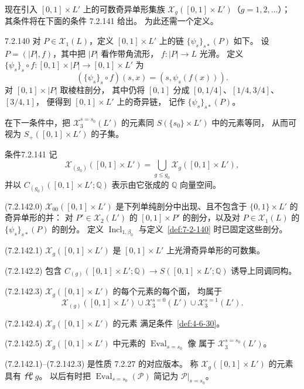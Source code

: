 现在引入 $[0,1]\times L'$ 上的可数奇异单形集族
$\mathcal X_g([0,1]\times L')$（$g=1,2,\ldots$）；
其条件将在下面的条件 7.2.141 给出。
为此还需一个定义。

\begin{definition}{7.2.140}\label{def:7-2-140}
对 $P\in\mathcal X_1(L)$，定义
$[0,1]\times L'$ 上的链 $\{\psi_s\}_{s*}(P)$ 如下。
设 $P=(|P|,f)$，其中把 $|P|$ 看作带角流形，
$f\colon|P|\to L$ 光滑。
定义
$\{\psi_s\}_s\circ f\colon
[0,1]\times|P|\to[0,1]\times L'$ 为
\[
(\{\psi_s\}_s\circ f)(s,x)
=(s,\psi_s(f(x))).
\]
对 $[0,1]\times|P|$ 取棱柱剖分，
其中仍将 $[0,1]$ 分成
$[0,1/4]$、$[1/4,3/4]$、$[3/4,1]$，
便得到 $[0,1]\times L'$ 上的奇异链，
记作 $\{\psi_s\}_{s*}(P)$。
\end{definition}

在下一条件中，把 $\mathcal X^{s=s_0}_3(L')$
的元素同 $S(\{s_0\}\times L')$ 中的元素等同，
从而可视为 $S_+([0,1]\times L')$ 的子集。

\begin{statement}{条件}{7.2.141}\label{cond:7-2-141}
记
\[
\mathcal X_{(g_0)}([0,1]\times L')
=\bigcup_{g\le g_0}\mathcal X_g([0,1]\times L'),
\]
并以 $C_{(g_0)}([0,1]\times L';\mathbb Q)$
表示由它张成的 $\mathbb Q$ 向量空间。

\noindent\textup{(7.2.142.0)}\quad
$\mathcal X_{00}([0,1]\times L')$
是下列单纯剖分中出现、且不包含于
$\{0,1\}\times L'$ 的奇异单形的并：
对 $P'\in\mathcal X_2(L')$ 的
$[0,1]\times P'$ 的剖分，以及对
$P\in\mathcal X_1(L)$ 的
$\{\psi_s\}_{s*}(P)$ 的剖分。
定义 $\operatorname{Incl}_{1,\beta_0}$
与定义~\ref{def:7-2-140} 时已固定这些剖分。

\noindent\textup{(7.2.142.1)}\quad
$\mathcal X_g([0,1]\times L')$
是 $[0,1]\times L'$ 上光滑奇异单形的可数集。

\noindent\textup{(7.2.142.2)}\quad
包含
$C_{(g)}([0,1]\times L';\mathbb Q)
\to S([0,1]\times L';\mathbb Q)$
诱导上同调同构。

\noindent\textup{(7.2.142.3)}\quad
$\mathcal X_g([0,1]\times L')$ 的每个元素的每个面，
均属于
\[
\mathcal X_{(g)}([0,1]\times L')
\cup\mathcal X_3^{s=0}(L')
\cup\mathcal X_3^{s=1}(L').
\]

\noindent\textup{(7.2.142.4)}\quad
$\mathcal X_g([0,1]\times L')$ 的元素
满足条件~\ref{def:4-6-30}。

\noindent\textup{(7.2.142.5)}\quad
$\mathcal X_g([0,1]\times L')$ 中元素的
$\operatorname{Eval}_{s=s_0}$ 像
属于 $\mathcal X^{s=s_0}_3(L')$。
\end{statement}

(7.2.142.1)--(7.2.142.3) 是性质 7.2.27 的对应版本。
称 $\mathcal X_g([0,1]\times L')$ 的元素具有
\emph{代 $g$}。
以后有时把
$\operatorname{Eval}_{s=s_0}(\mathcal P)$
简记为 $\mathcal P|_{s=s_0}$。


